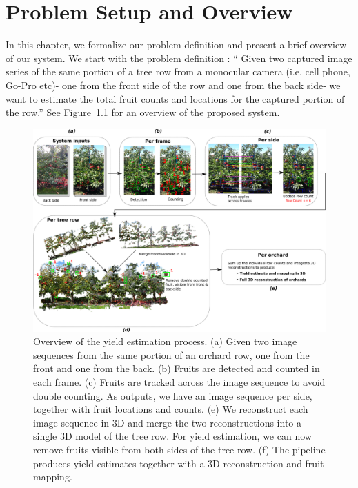 \chapter{Problem Setup and Overview }
\label{chapter:preliminaries}

In this chapter, we formalize our problem definition and present a brief overview of our system. We start with the problem definition : `` Given two captured image series of the same portion of a tree row from a monocular camera (i.e. cell phone, Go-Pro etc)- one from the front side of the row and one from the back side- we want to estimate the total fruit counts and locations for the captured portion of the row.'' See Figure~\ref{fig:concept} for an overview of the proposed system.
\begin{figure}[ht!]
	\centering
	\includegraphics[width=\textwidth]{figures/prelim/conceptFigure.png}
	\caption{Overview of the yield estimation process. (a) Given two image sequences from the same portion of an orchard row, one from the front and one from the back. (b) Fruits are detected and counted in each frame. (c) Fruits are tracked across the image sequence to avoid double counting. As outputs, we have an image sequence per side, together with fruit locations and counts. (e) We reconstruct each image sequence in 3D and merge the two reconstructions into a single 3D model of the tree row. For yield estimation, we can now remove fruits visible from both sides of the tree row. (f) The pipeline produces yield estimates together with a 3D reconstruction and fruit mapping.}
	\label{fig:concept}
\end{figure}
